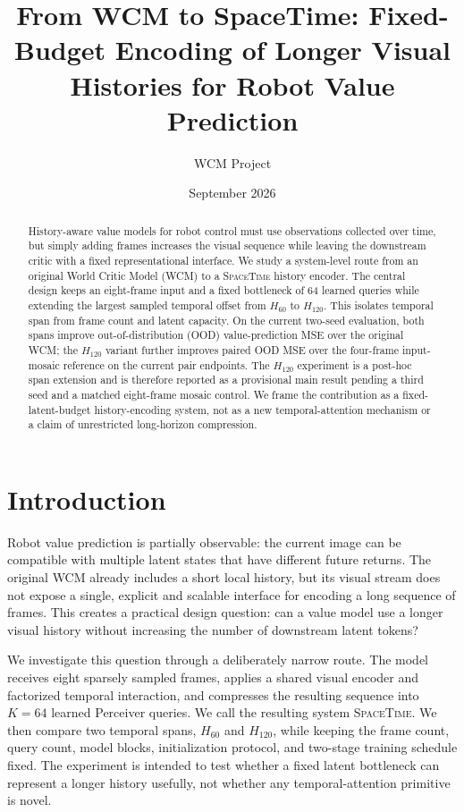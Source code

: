 \documentclass[10pt,a4paper]{article}
\title{From WCM to SpaceTime: Fixed-Budget Encoding of Longer Visual Histories for Robot Value Prediction}
\author{WCM Project}
\date{September 2026}
\newcommand{\SpaceTime}{\textsc{SpaceTime}}
\newcommand{\WCM}{\textsc{WCM}}
\begin{document}
\maketitle

\begin{abstract}
History-aware value models for robot control must use observations collected over time, but simply adding frames increases the visual sequence while leaving the downstream critic with a fixed representational interface. We study a system-level route from an original World Critic Model (WCM) to a \SpaceTime{} history encoder. The central design keeps an eight-frame input and a fixed bottleneck of 64 learned queries while extending the largest sampled temporal offset from $H_{60}$ to $H_{120}$. This isolates temporal span from frame count and latent capacity. On the current two-seed evaluation, both spans improve out-of-distribution (OOD) value-prediction MSE over the original WCM; the $H_{120}$ variant further improves paired OOD MSE over the four-frame input-mosaic reference on the current pair endpoints. The $H_{120}$ experiment is a post-hoc span extension and is therefore reported as a provisional main result pending a third seed and a matched eight-frame mosaic control. We frame the contribution as a fixed-latent-budget history-encoding system, not as a new temporal-attention mechanism or a claim of unrestricted long-horizon compression.
\end{abstract}

\section{Introduction}

Robot value prediction is partially observable: the current image can be compatible with multiple latent states that have different future returns. The original \WCM{} already includes a short local history, but its visual stream does not expose a single, explicit and scalable interface for encoding a long sequence of frames. This creates a practical design question: can a value model use a longer visual history without increasing the number of downstream latent tokens?

We investigate this question through a deliberately narrow route. The model receives eight sparsely sampled frames, applies a shared visual encoder and factorized temporal interaction, and compresses the resulting sequence into $K=64$ learned Perceiver queries. We call the resulting system \SpaceTime{}. We then compare two temporal spans, $H_{60}$ and $H_{120}$, while keeping the frame count, query count, model blocks, initialization protocol, and two-stage training schedule fixed. The experiment is intended to test whether a fixed latent bottleneck can represent a longer history usefully, not whether any temporal-attention primitive is novel.
\end{document}
